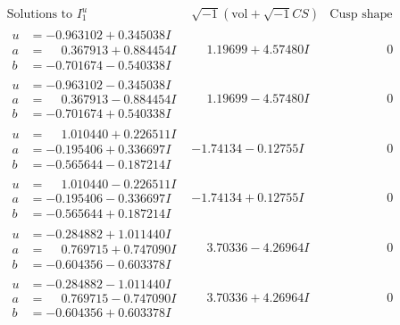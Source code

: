 \documentclass[1p]{elsarticle_modified}
\theoremstyle{definition}
\newcommand{\I}{\sqrt{-1}}
\begin{document}
$$\begin{array}{c|c|c}  
\text{Solutions to }I^u_{1}& \I (\text{vol} + \sqrt{-1}CS) & \text{Cusp shape}\\
 \hline 
\begin{aligned}
u &= -0.963102 + 0.345038 I \\
a &= \phantom{-}0.367913 + 0.884454 I \\
b &= -0.701674 - 0.540338 I\end{aligned}
 & \phantom{-}1.19699 + 4.57480 I & \phantom{-0.000000 } 0 \\ \hline\begin{aligned}
u &= -0.963102 - 0.345038 I \\
a &= \phantom{-}0.367913 - 0.884454 I \\
b &= -0.701674 + 0.540338 I\end{aligned}
 & \phantom{-}1.19699 - 4.57480 I & \phantom{-0.000000 } 0 \\ \hline\begin{aligned}
u &= \phantom{-}1.010440 + 0.226511 I \\
a &= -0.195406 + 0.336697 I \\
b &= -0.565644 - 0.187214 I\end{aligned}
 & -1.74134 - 0.12755 I & \phantom{-0.000000 } 0 \\ \hline\begin{aligned}
u &= \phantom{-}1.010440 - 0.226511 I \\
a &= -0.195406 - 0.336697 I \\
b &= -0.565644 + 0.187214 I\end{aligned}
 & -1.74134 + 0.12755 I & \phantom{-0.000000 } 0 \\ \hline\begin{aligned}
u &= -0.284882 + 1.011440 I \\
a &= \phantom{-}0.769715 + 0.747090 I \\
b &= -0.604356 - 0.603378 I\end{aligned}
 & \phantom{-}3.70336 - 4.26964 I & \phantom{-0.000000 } 0 \\ \hline\begin{aligned}
u &= -0.284882 - 1.011440 I \\
a &= \phantom{-}0.769715 - 0.747090 I \\
b &= -0.604356 + 0.603378 I\end{aligned}
 & \phantom{-}3.70336 + 4.26964 I & \phantom{-0.000000 } 0 \\ \hline\begin{aligned}

\end{aligned}
\end{array}$$
\end{document}
